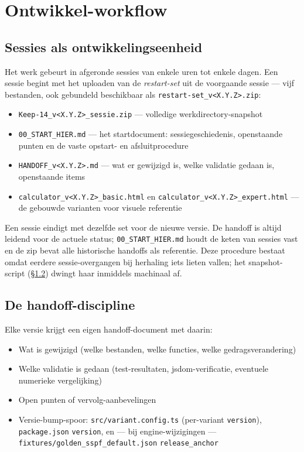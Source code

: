 \documentclass[11pt,a4paper]{article}
\newcommand{\code}[1]{\texttt{#1}}
\begin{document}
\section{Ontwikkel-workflow}
\label{sec:workflow}

\subsection{Sessies als ontwikkelingseenheid}

Het werk gebeurt in afgeronde sessies van enkele uren tot enkele dagen. Een sessie begint met het uploaden van de \emph{restart-set} uit de voorgaande sessie --- vijf bestanden, ook gebundeld beschikbaar als \code{restart-set\_v\textless X.Y.Z\textgreater.zip}:

\begin{itemize}
\item \code{Keep-14\_v\textless X.Y.Z\textgreater\_sessie.zip} --- volledige werkdirectory-snapshot
\item \code{00\_START\_HIER.md} --- het startdocument: sessiegeschiedenis, openstaande punten en de vaste opstart- en afsluitprocedure
\item \code{HANDOFF\_v\textless X.Y.Z\textgreater.md} --- wat er gewijzigd is, welke validatie gedaan is, openstaande items
\item \code{calculator\_v\textless X.Y.Z\textgreater\_basic.html} en \code{calculator\_v\textless X.Y.Z\textgreater\_expert.html} --- de gebouwde varianten voor visuele referentie
\end{itemize}

Een sessie eindigt met dezelfde set voor de nieuwe versie. De handoff is altijd leidend voor de actuele status; \code{00\_START\_HIER.md} houdt de keten van sessies vast en de zip bevat alle historische handoffs als referentie. Deze procedure bestaat omdat eerdere sessie-overgangen bij herhaling iets lieten vallen; het snapshot-script (\S\ref{sec:handoff}) dwingt haar inmiddels machinaal af.

\subsection{De handoff-discipline}
\label{sec:handoff}

Elke versie krijgt een eigen handoff-document met daarin:

\begin{itemize}
\item Wat is gewijzigd (welke bestanden, welke functies, welke gedragsverandering)
\item Welke validatie is gedaan (test-resultaten, jsdom-verificatie, eventuele numerieke vergelijking)
\item Open punten of vervolg-aanbevelingen
\item Versie-bump-spoor: \code{src/variant.config.ts} (per-variant \code{version}), \code{package.json} \code{version}, en --- bij engine-wijzigingen --- \code{fixtures/}\allowbreak\code{golden\_sspf\_default.json} \code{release\_anchor}
\end{itemize}
\end{document}
